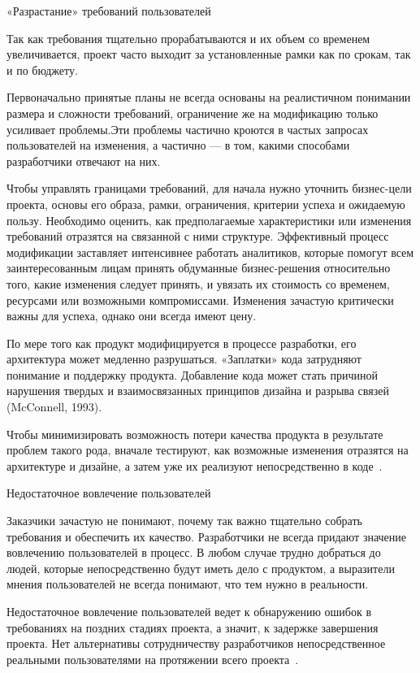 \documentclass{../industrial-development}
\begin{document}
{\alert{«Разрастание» требований пользователей}

Так как требования тщательно прорабатываются и их объем со временем увеличивается, проект часто выходит за установленные рамки как по срокам, так и по бюджету. 

Первоначально принятые планы не всегда основаны на реалистичном понимании размера и сложности требований, ограничение же на модификацию только усиливает проблемы.Эти проблемы частично кроются в частых запросах пользователей на изменения, а частично — в том, какими способами разработчики отвечают на них.

Чтобы управлять границами требований, для начала нужно уточнить бизнес-цели проекта, основы его образа, рамки, ограничения, критерии успеха и ожидаемую пользу. Необходимо оценить, как предполагаемые характеристики или изменения требований отразятся на связанной с ними структуре. Эффективный процесс модификации заставляет интенсивнее работать аналитиков, которые помогут всем заинтересованным
лицам принять обдуманные бизнес-решения относительно того, какие изменения следует принять, и увязать их стоимость со временем, ресурсами или возможными компромиссами. Изменения зачастую критически важны для успеха, однако они всегда имеют цену.

По мере того как продукт модифицируется в процессе разработки, его архитектура может медленно разрушаться. «Заплатки» кода затрудняют понимание и поддержку продукта. Добавление кода может стать причиной нарушения твердых и взаимосвязанных принципов дизайна и разрыва связей (McConnell, 1993). 

Чтобы минимизировать
возможность потери качества продукта в результате проблем такого рода, вначале тестируют, как возможные изменения отразятся на архитектуре и дизайне, а затем уже их реализуют непосредственно
в коде~\cite[с.~17-18]{Wiegers}.

\alert{Недостаточное вовлечение пользователей}

Заказчики зачастую не понимают, почему так важно тщательно собрать требования и обеспечить их качество. Разработчики не всегда придают значение вовлечению пользователей в процесс. В любом случае трудно добраться до
людей, которые непосредственно будут иметь дело с продуктом, а выразители мнения пользователей не всегда понимают, что тем нужно в реальности. 

Недостаточное вовлечение пользователей ведет к обнаружению ошибок в требованиях на поздних стадиях проекта, а значит, к задержке завершения проекта. Нет альтернативы сотрудничеству
разработчиков непосредственное реальными пользователями на протяжении всего проекта~\cite[с.~17]{Wiegers}.

}
\end{document}
